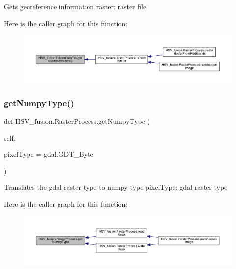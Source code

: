 \begin{DoxyVerb}Gets georeference information
raster: raster file 
\end{DoxyVerb}
 Here is the caller graph for this function\+:
\nopagebreak
\begin{figure}[H]
\begin{center}
\leavevmode
\includegraphics[width=350pt]{class_h_s_v__fusion_1_1_raster_process_a357a8425c826c106f8f07106cf3178de_icgraph}
\end{center}
\end{figure}
\mbox{\label{class_h_s_v__fusion_1_1_raster_process_aaa5f6ae93ead92ab03eefd80e1318296}} 
\subsubsection{\texorpdfstring{get\+Numpy\+Type()}{getNumpyType()}}
{\footnotesize\ttfamily def H\+S\+V\+\_\+fusion.\+Raster\+Process.\+get\+Numpy\+Type (\begin{DoxyParamCaption}\item[{}]{self,  }\item[{}]{pixel\+Type = {\ttfamily gdal.GDT\+\_\+Byte} }\end{DoxyParamCaption})}

\begin{DoxyVerb}Translates the gdal raster type to numpy type
pixelType: gdal raster type
\end{DoxyVerb}
 Here is the caller graph for this function\+:
\nopagebreak
\begin{figure}[H]
\begin{center}
\leavevmode
\includegraphics[width=350pt]{class_h_s_v__fusion_1_1_raster_process_aaa5f6ae93ead92ab03eefd80e1318296_icgraph}
\end{center}
\end{figure}
\mbox{\label{class_h_s_v__fusion_1_1_raster_process_ab73a0820df58431093d3d6697c36beec}} 
